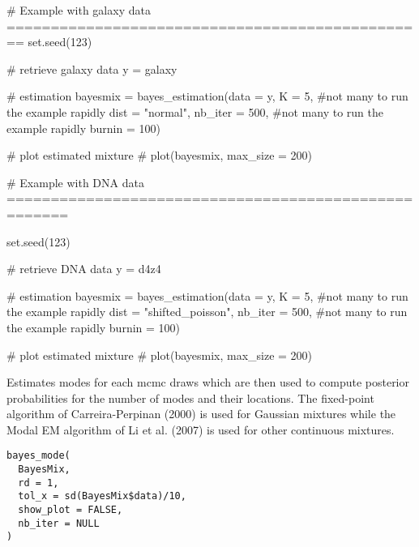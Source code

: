 \documentclass[a4paper]{book}
\begin{document}
\begin{Examples}
\begin{ExampleCode}
# Example with galaxy data ================================================
set.seed(123) 

# retrieve galaxy data
y = galaxy

# estimation
bayesmix = bayes_estimation(data = y,
                           K = 5, #not many to run the example rapidly
                           dist = "normal",
                           nb_iter = 500, #not many to run the example rapidly
                           burnin = 100)
                           
# plot estimated mixture
# plot(bayesmix, max_size = 200)

# Example with DNA data =====================================================

set.seed(123) 

# retrieve DNA data
y = d4z4

# estimation
bayesmix = bayes_estimation(data = y,
                           K = 5, #not many to run the example rapidly
                           dist = "shifted_poisson",
                           nb_iter = 500, #not many to run the example rapidly
                           burnin = 100)
                           
# plot estimated mixture
# plot(bayesmix, max_size = 200)


\end{ExampleCode}
\end{Examples}
%
\begin{Description}\relax
Estimates modes for each mcmc draws which are then used to compute posterior probabilities for the number of modes and their locations.
The fixed-point algorithm of Carreira-Perpinan (2000) is used for Gaussian mixtures
while the Modal EM algorithm of Li et al. (2007) is used for other continuous mixtures.
\end{Description}
%
\begin{Usage}
\begin{verbatim}
bayes_mode(
  BayesMix,
  rd = 1,
  tol_x = sd(BayesMix$data)/10,
  show_plot = FALSE,
  nb_iter = NULL
)
\end{verbatim}
\end{Usage}
%
\end{document}
